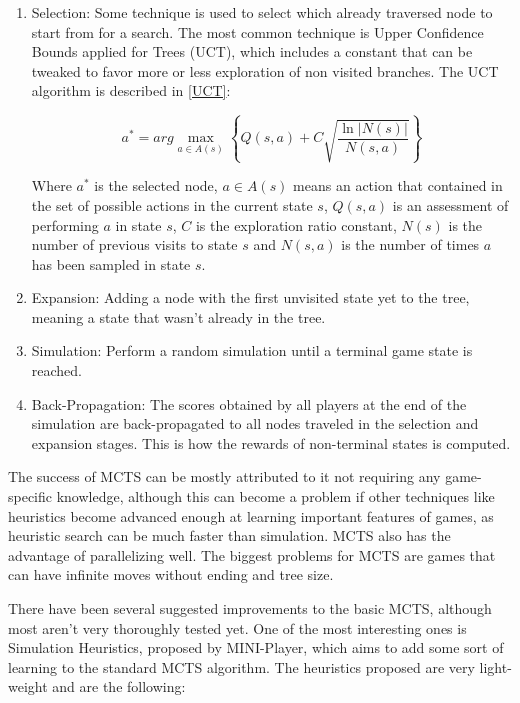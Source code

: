 \begin{enumerate}

\item Selection: Some technique is used to select which already traversed node to start from for a search. The most common technique is Upper Confidence Bounds applied for Trees (UCT), which includes a constant that can be tweaked to favor more or less exploration of non visited branches. The UCT algorithm is described in \ref{UCT}:

\begin{center}
\begin{equation} \label{UCT}
a^{*} = arg \max_{a\in A(s)} \left \{ Q(s,a) + C \sqrt{\frac{\ln|N(s)|} {N(s,a)}} \right \}
\end{equation}
\end{center}

Where $a^{*}$ is the selected node, $a \in A(s)$ means an action that contained in the set of possible actions in the current state $s$, $Q(s,a)$ is an assessment of performing $a$ in state $s$, $C$ is the exploration ratio constant, $N(s)$ is the number of previous visits to state $s$ and $N(s,a)$ is the number of times $a$ has been sampled in state $s$.

\item Expansion: Adding a node with the first unvisited state yet to the tree, meaning a state that wasn’t already in the tree.

\item Simulation: Perform a random simulation until a terminal game state is reached.

\item Back-Propagation: The scores obtained by all players at the end of the simulation are back-propagated to all nodes traveled in the selection and expansion stages. This is how the rewards of non-terminal states is computed.

\end{enumerate}

The success of MCTS can be mostly attributed to it not requiring any game-specific knowledge, although this can become a problem if other techniques like heuristics become advanced enough at learning important features of games, as heuristic search can be much faster than simulation. MCTS also has the advantage of parallelizing well. The biggest problems for MCTS are games that can have infinite moves without ending and tree size.

There have been several suggested improvements to the basic MCTS, although most aren’t very thoroughly tested yet. One of the most interesting ones is Simulation Heuristics, proposed by MINI-Player, which aims to add some sort of learning to the standard MCTS algorithm. The heuristics proposed are very light-weight and are the following:

